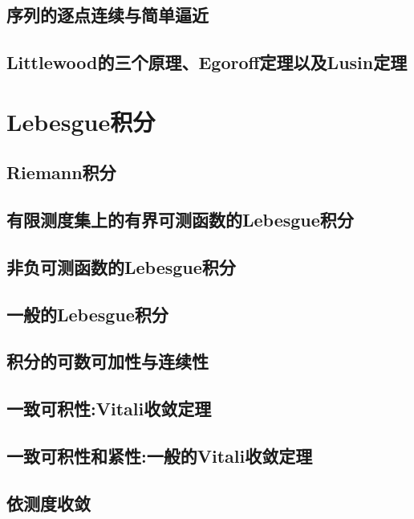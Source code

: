 \documentclass[lang=cn,newtx,10pt,scheme=chinese]{elegantbook}
\begin{document}
\section{序列的逐点连续与简单逼近}

\section{Littlewood的三个原理、Egoroff定理以及Lusin定理}









\chapter{Lebesgue积分}

\section{Riemann积分}

\section{有限测度集上的有界可测函数的Lebesgue积分}

\section{非负可测函数的Lebesgue积分}

\section{一般的Lebesgue积分}

\section{积分的可数可加性与连续性}

\section{一致可积性:Vitali收敛定理}

\section{一致可积性和紧性:一般的Vitali收敛定理}

\section{依测度收敛}
\end{document}
